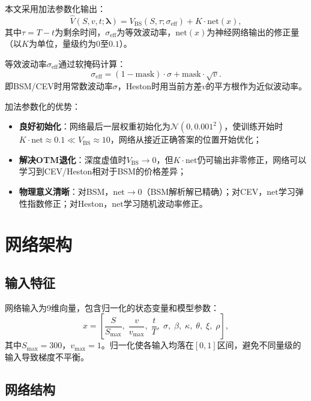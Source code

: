 本文采用加法参数化输出：
\begin{equation}\label{eq:additive}
  \hat{V}(S,v,t;\boldsymbol{\lambda}) = V_\text{BS}(S,\tau;\sigma_\text{eff}) + K\cdot\text{net}(x),
\end{equation}
其中$\tau=T-t$为剩余时间，$\sigma_\text{eff}$为等效波动率，$\text{net}(x)$为神经网络输出的修正量（以$K$为单位，量级约为$0$至$0.1$）。

等效波动率$\sigma_\text{eff}$通过软掩码计算：
\begin{equation}\label{eq:sigma_eff}
  \sigma_\text{eff} = (1-\text{mask})\cdot\sigma + \text{mask}\cdot\sqrt{v}.
\end{equation}
即BSM/CEV时用常数波动率$\sigma$，Heston时用当前方差$v$的平方根作为近似波动率。

加法参数化的优势：
\begin{itemize}
  \item \textbf{良好初始化}：网络最后一层权重初始化为$\mathcal{N}(0, 0.001^2)$，使训练开始时$K\cdot\text{net}\approx 0.1\ll V_\text{BS}\approx 10$，网络从接近正确答案的位置开始优化；
  \item \textbf{解决OTM退化}：深度虚值时$V_\text{BS}\to 0$，但$K\cdot\text{net}$仍可输出非零修正，网络可以学习到CEV/Heston相对于BSM的价格差异；
  \item \textbf{物理意义清晰}：对BSM，$\text{net}\to 0$（BSM解析解已精确）；对CEV，$\text{net}$学习弹性指数修正；对Heston，$\text{net}$学习随机波动率修正。
\end{itemize}

\section{网络架构}\label{sec:architecture}

\subsection{输入特征}

网络输入为9维向量，包含归一化的状态变量和模型参数：
\begin{equation}
  x = \left[\frac{S}{S_\text{max}},\; \frac{v}{v_\text{max}},\; \frac{t}{T},\; \sigma,\; \beta,\; \kappa,\; \theta,\; \xi,\; \rho\right],
\end{equation}
其中$S_\text{max}=300$，$v_\text{max}=1$。归一化使各输入均落在$[0,1]$区间，避免不同量级的输入导致梯度不平衡。

\subsection{网络结构}

